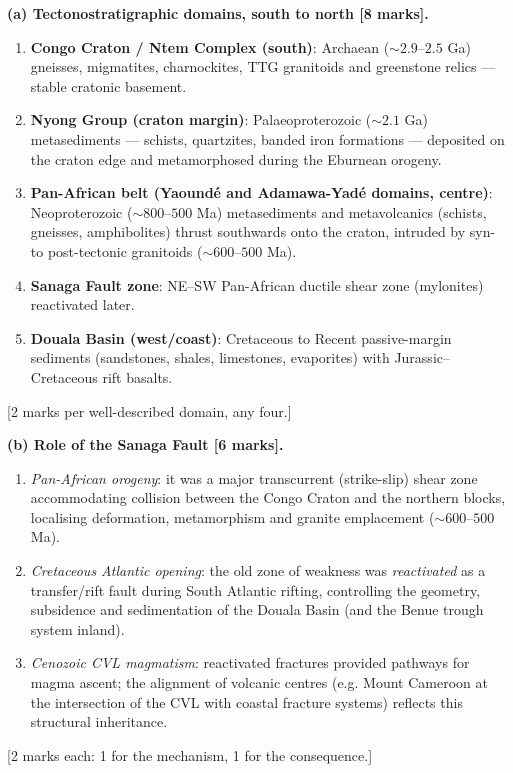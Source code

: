 \documentclass[11pt]{article}
\begin{document}
\begin{corrige}
\textbf{(a) Tectonostratigraphic domains, south to north [8 marks].}
\begin{enumerate}
\item \textbf{Congo Craton / Ntem Complex (south)}: Archaean ($\sim 2.9$–$2.5$ Ga) gneisses, migmatites, charnockites, TTG granitoids and greenstone relics — stable cratonic basement.
\item \textbf{Nyong Group (craton margin)}: Palaeoproterozoic ($\sim 2.1$ Ga) metasediments — schists, quartzites, banded iron formations — deposited on the craton edge and metamorphosed during the Eburnean orogeny.
\item \textbf{Pan-African belt (Yaoundé and Adamawa-Yadé domains, centre)}: Neoproterozoic ($\sim 800$–$500$ Ma) metasediments and metavolcanics (schists, gneisses, amphibolites) thrust southwards onto the craton, intruded by syn- to post-tectonic granitoids ($\sim 600$–$500$ Ma).
\item \textbf{Sanaga Fault zone}: NE–SW Pan-African ductile shear zone (mylonites) reactivated later.
\item \textbf{Douala Basin (west/coast)}: Cretaceous to Recent passive-margin sediments (sandstones, shales, limestones, evaporites) with Jurassic–Cretaceous rift basalts.
\end{enumerate}
[2 marks per well-described domain, any four.]

\textbf{(b) Role of the Sanaga Fault [6 marks].}
\begin{enumerate}
\item \emph{Pan-African orogeny}: it was a major transcurrent (strike-slip) shear zone accommodating collision between the Congo Craton and the northern blocks, localising deformation, metamorphism and granite emplacement ($\sim 600$–$500$ Ma).
\item \emph{Cretaceous Atlantic opening}: the old zone of weakness was \emph{reactivated} as a transfer/rift fault during South Atlantic rifting, controlling the geometry, subsidence and sedimentation of the Douala Basin (and the Benue trough system inland).
\item \emph{Cenozoic CVL magmatism}: reactivated fractures provided pathways for magma ascent; the alignment of volcanic centres (e.g. Mount Cameroon at the intersection of the CVL with coastal fracture systems) reflects this structural inheritance.
\end{enumerate}
[2 marks each: 1 for the mechanism, 1 for the consequence.]


\end{corrige}
\end{document}
